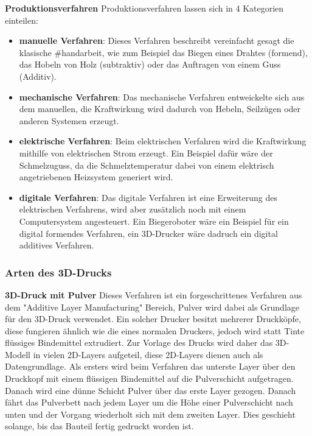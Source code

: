 \textbf{Produktionsverfahren}
Produktionsverfahren lassen sich in 4 Kategorien einteilen:
\begin{itemize}
    \item \textbf{manuelle Verfahren}: Dieses Verfahren beschreibt vereinfacht gesagt die klasische #handarbeit, wie zum Beispiel das Biegen eines Drahtes (formend), das Hobeln von Holz (subtraktiv) oder das Auftragen von einem Guss (Additiv).
    \item \textbf{mechanische Verfahren}: Das mechanische Verfahren entweickelte sich aus dem manuellen, die Kraftwirkung wird dadurch von Hebeln, Seilzügen oder anderen Systemen erzeugt.
    \item \textbf{elektrische Verfahren}: Beim elektrischen Verfahren wird die Kraftwirkung mithilfe von elektrischen Strom erzeugt. Ein Beispiel dafür wäre der Schmelzuguss, da die Schmelztemperatur dabei von einem elektrisch angetriebenen Heizsystem generiert wird.
    \item \textbf{digitale Verfahren}: Das digitale Verfahren ist eine Erweiterung des elektrischen Verfahrens, wird aber zusätzlich noch mit einem Computersystem angesteuert. Ein Biegeroboter wäre ein Beispiel für ein digital formendes Verfahren, ein 3D-Drucker wäre dadruch ein digital additives Verfahren.
\end{itemize}

\subsubsection{Arten des 3D-Drucks}
\textbf{3D-Druck mit Pulver}
Dieses Verfahren ist ein forgeschrittenes Verfahren aus dem "Additive Layer Manufacturing" Bereich, Pulver wird dabei
als Grundlage für den 3D-Druck verwendet. Ein solcher Drucker besitzt mehrerer Druckköpfe, diese fungieren ähnlich wie
die eines normalen Druckers, jedoch wird statt Tinte flüssiges Bindemittel extrudiert. Zur Vorlage des Drucks wird daher das
3D-Modell in vielen 2D-Layers aufgeteil, diese 2D-Layers dienen auch als Datengrundlage.
Als ersters wird beim Verfahren das unterste Layer über den Druckkopf mit einem flüssigen Bindemittel auf die Pulverschicht
aufgetragen. Danach wird eine dünne Schicht Pulver über das erste Layer gezogen. Danach fährt
das Pulverbett nach jedem Layer um die Höhe einer Pulverschicht nach unten und der Vorgang wiederholt sich mit dem
zweiten Layer. Dies geschieht solange, bis das Bauteil fertig gedruckt worden ist.\\

